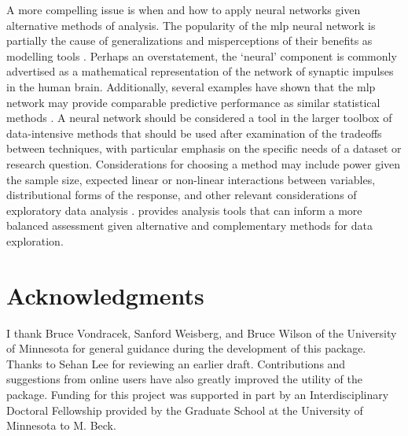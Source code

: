 \documentclass[article,shortnames]{jss}\usepackage[]{graphicx}\usepackage[]{color}
\begin{document}
A more compelling issue is when and how to apply neural networks given alternative methods of analysis.  The popularity of the \ac{mlp} neural network is partially the cause of generalizations and misperceptions of their benefits as modelling tools \citep{Burke97}. Perhaps an overstatement, the `neural' component is commonly advertised as a mathematical representation of the network of synaptic impulses in the human brain.  Additionally, several examples have shown that the \ac{mlp} network may provide comparable predictive performance as similar statistical methods \citep{Feng02,Razi05,Beck14a}.  A neural network should be considered a tool in the larger toolbox of data-intensive methods that should be used after examination of the tradeoffs between techniques, with particular emphasis on the specific needs of a dataset or research question.  Considerations for choosing a method may include power given the sample size, expected linear or non-linear interactions between variables, distributional forms of the response, and other relevant considerations of exploratory data analysis \citep{Zuur10}.   provides analysis tools that can inform a more balanced assessment given alternative and complementary methods for data exploration.

\section[Acknowledgments]{Acknowledgments}
 
I thank Bruce Vondracek, Sanford Weisberg, and Bruce Wilson of the University of Minnesota for general guidance during the development of this package.  Thanks to Sehan Lee for reviewing an earlier draft.  Contributions and suggestions from online users have also greatly improved the utility of the package.  Funding for this project was supported in part by an Interdisciplinary Doctoral Fellowship provided by the Graduate School at the University of Minnesota to M. Beck.  

% 
% 

\end{document}
